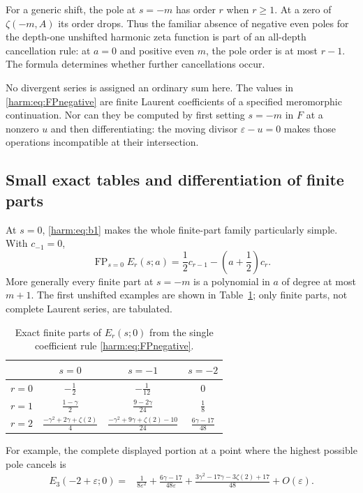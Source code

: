 \documentclass[11pt,letterpaper]{article}
\numberwithin{equation}{section}
\theoremstyle{plain}
\theoremstyle{definition}
\theoremstyle{remark}
\begin{document}
For a generic shift, the pole at $s=-m$ has order $r$ when $r\geq1$.
At a zero of $\zeta(-m,A)$ its order drops.  Thus the familiar
absence of negative even poles for the depth-one unshifted harmonic
zeta function is part of an all-depth cancellation rule: at $a=0$
and positive even $m$, the pole order is at most $r-1$.  The formula
determines whether further cancellations occur.

No divergent series is assigned an ordinary sum here.  The values in
\eqref{harm:eq:FPnegative} are finite Laurent coefficients of a
specified meromorphic continuation.  Nor can they be computed by
first setting $s=-m$ in $F$ at a nonzero $u$ and then differentiating:
the moving divisor $\varepsilon-u=0$ makes those operations
incompatible at their intersection.

\subsection{Small exact tables and differentiation of finite parts}

At $s=0$, \eqref{harm:eq:b1} makes the whole finite-part family
particularly simple.  With $c_{-1}=0$,
\begin{equation}\label{harm:eq:zeroall}
 \operatorname{FP}_{s=0}E_r(s;a)
       =\frac12c_{r-1}-\left(a+\frac12\right)c_r.
\end{equation}
More generally every finite part at $s=-m$ is a polynomial in $a$
of degree at most $m+1$.  The first unshifted examples are shown in
Table~\ref{harm:tab:FP}; only finite parts, not complete Laurent
series, are tabulated.

\begin{table}[htbp]
\centering
\small
\renewcommand{\arraystretch}{1.6}
\begin{tabular}{c|ccc}
 & $s=0$ & $s=-1$ & $s=-2$\\\hline
 $r=0$ & $-\tfrac12$ & $-\tfrac1{12}$ & $0$\\
 $r=1$ & $\tfrac{1-\gamma}{2}$ & $\tfrac{9-2\gamma}{24}$ & $\tfrac18$\\
 $r=2$ & $\tfrac{-\gamma^2+2\gamma+\zeta(2)}4$
       & $\tfrac{-\gamma^2+9\gamma+\zeta(2)-10}{24}$
       & $\tfrac{6\gamma-17}{48}$
\end{tabular}
\caption{Exact finite parts of $E_r(s;0)$ from the single
coefficient rule \eqref{harm:eq:FPnegative}.}
\label{harm:tab:FP}
\end{table}

For example, the complete displayed portion at a point where the
highest possible pole cancels is
\begin{align}
 E_3(-2+\varepsilon;0)
  ={}&\frac1{8\varepsilon^2}
       +\frac{6\gamma-17}{48\varepsilon}
       +\frac{3\gamma^2-17\gamma-3\zeta(2)+17}{48}
       +O(\varepsilon).\label{harm:eq:cancelledexample}
\end{align}
\end{document}
